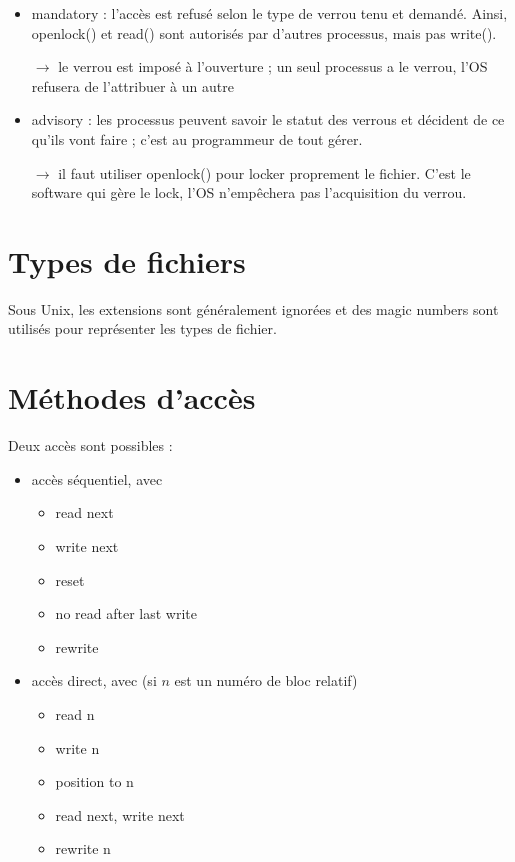 	\begin{itemize}
		\item mandatory : l'accès est refusé selon le type de verrou tenu et demandé. Ainsi, openlock() et read() sont autorisés par d'autres processus, mais pas write().
		\item[$\rightarrow$] le verrou est imposé à l'ouverture ; un seul processus a le verrou, l'OS refusera de l'attribuer à un autre
		\item advisory : les processus peuvent savoir le statut des verrous et décident de ce qu'ils vont faire ; c'est au programmeur de tout gérer.
		\item[$\rightarrow$] il faut utiliser openlock() pour locker proprement le fichier. C'est le software qui gère le lock, l'OS n'empêchera pas l'acquisition du verrou.
	\end{itemize}
	
	
\section{Types de fichiers}


Sous Unix, les extensions sont généralement ignorées et des magic numbers sont utilisés pour représenter les types de fichier.


\section{Méthodes d'accès}

Deux accès sont possibles :

\begin{itemize}
	\item accès séquentiel, avec
	
	\begin{itemize}
		\item read next
		\item write next
		\item reset
		\item no read after last write
		\item rewrite
	\end{itemize}
	
	
	\item accès direct, avec (si $n$ est un numéro de bloc relatif)
	\begin{itemize}
		\item read n
		\item write n
		\item position to n
		\item read next, write next
		\item rewrite n
	\end{itemize}
\end{itemize}


